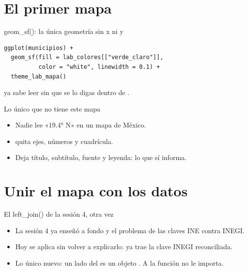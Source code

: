 \section{El primer mapa}

\begin{frame}[fragile]{geom\_sf(): la única geometría sin x ni y}
\begin{lstlisting}
ggplot(municipios) +
  geom_sf(fill = lab_colores[["verde_claro"]],
          color = "white", linewidth = 0.1) +
  theme_lab_mapa()
\end{lstlisting}

  \vspace{0.6em}
   ya sabe leer  sin que se lo digas
  dentro de .
\end{frame}

\begin{frame}{Lo único que no tiene este mapa}
  \vspace{0.3em}
  \begin{itemize}\setlength{\itemsep}{0.85em}
    \item<1-> Nadie lee «19.4° N» en un mapa de México.
    \item<2->  quita ejes, números y
          cuadrícula.
    \item<3-> Deja título, subtítulo, fuente y leyenda: lo que sí
          informa.
  \end{itemize}
\end{frame}

\section{Unir el mapa con los datos}

\begin{frame}{El left\_join() de la sesión 4, otra vez}
  \vspace{0.3em}
  \begin{itemize}\setlength{\itemsep}{0.85em}
    \item<1-> La sesión 4 ya enseñó a fondo  y el
          problema de las claves INE contra INEGI.
    \item<2-> Hoy se aplica sin volver a explicarlo:
           ya trae la clave
          INEGI reconciliada.
    \item<3-> Lo único nuevo: un lado del  es un
          objeto . A la función no le importa.
  \end{itemize}
\end{frame}

